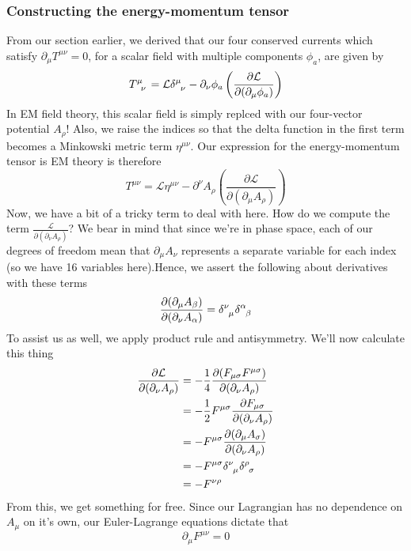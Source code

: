 \subsubsection{Constructing the energy-momentum tensor}
From our section earlier, we derived that our four conserved currents which satisfy $ \partial_\mu T^{ \mu \nu} = 0 $, for a scalar field with multiple components $ \phi_a$, are given by 
\[
T\indices{^\mu_\nu} = \mathcal{L} \delta \indices{^\mu_\nu}  - \partial_\nu \phi_a \left( \frac{ \partial \mathcal{L} }{ \partial ( \partial_\mu \phi_a ) } \right) 
\] 
In EM field theory, this scalar field is simply replced with our four-vector potential $A_\rho$! Also, we raise the indices so that the delta function in the first term becomes a Minkowski metric term $\eta^{ \mu \nu } $. Our expression for the energy-momentum tensor is EM theory is therefore 
\[ 
T^{ \mu \nu} = \mathcal{L} \eta^{ \mu\nu}  - \partial^\nu A_\rho \left( \frac{ \partial \mathcal{ L}}{ \partial ( \partial_\mu A_\rho ) } \right) 
\] 
Now, we have a bit of a tricky term to deal with here. How do we compute the term $ \frac{ \mathcal{L} }{ \partial ( \partial_\nu A_\rho) } $? We bear in mind that since we're in phase space, each of our degrees of freedom mean that $\partial_\mu A_\nu $ represents a separate variable for each index (so we have 16 variables here).Hence, we assert the following about derivatives with these terms
\[ 
\frac{ \partial ( \partial_\mu A_\beta) }{ \partial (\partial_\nu A_\alpha) }  = \delta\indices{^\nu_\mu} \delta \indices{^\alpha_\beta} 
\] 	
To assist us as well, we apply product rule and antisymmetry. We'll now calculate this thing 
\begin{align*} 
\frac{ \partial \mathcal{ L} }{ \partial ( \partial_\nu A_\rho ) } & =  - \frac{1}{4} \frac{ \partial ( F_{\mu \sigma} F^{ \mu \sigma} )}{ \partial ( \partial_\nu A_\rho ) } \\
&=  - \frac{1}{2} F^{\mu \sigma} \frac{ \partial F_{ \mu \sigma } }{ \partial ( \partial_\nu A_\rho) } \\
&=  - F^{ \mu \sigma} \frac{ \partial ( \partial_\mu A_\sigma) }{ \partial ( \partial_\nu A_\rho ) } \\
& =  - F^{ \mu \sigma} \delta \indices{^\nu_\mu} \delta\indices{^\rho_\sigma} \\
&=  - F^{ \nu \rho} 
\end{align*} 
From this, we get something for free. Since our Lagrangian has no dependence on $A_\mu$ on it's own, our Euler-Lagrange equations dictate that 
\[ 
\partial_\mu F^{ \mu \nu}  =0 
\]
